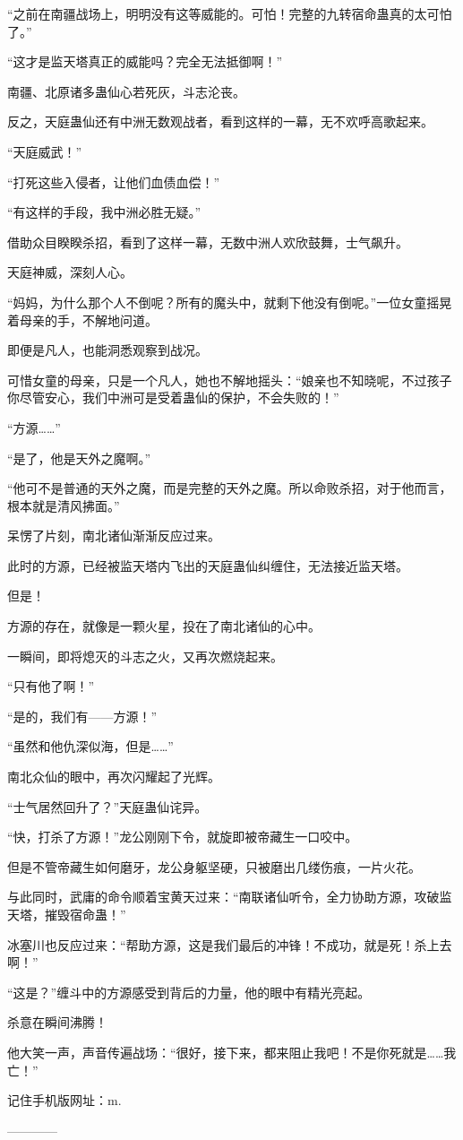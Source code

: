 \begin{this_body}
“之前在南疆战场上，明明没有这等威能的。可怕！完整的九转宿命蛊真的太可怕了。”

“这才是监天塔真正的威能吗？完全无法抵御啊！”

南疆、北原诸多蛊仙心若死灰，斗志沦丧。

反之，天庭蛊仙还有中洲无数观战者，看到这样的一幕，无不欢呼高歌起来。

“天庭威武！”

“打死这些入侵者，让他们血债血偿！”

“有这样的手段，我中洲必胜无疑。”

借助众目睽睽杀招，看到了这样一幕，无数中洲人欢欣鼓舞，士气飙升。

天庭神威，深刻人心。

“妈妈，为什么那个人不倒呢？所有的魔头中，就剩下他没有倒呢。”一位女童摇晃着母亲的手，不解地问道。

即便是凡人，也能洞悉观察到战况。

可惜女童的母亲，只是一个凡人，她也不解地摇头：“娘亲也不知晓呢，不过孩子你尽管安心，我们中洲可是受着蛊仙的保护，不会失败的！”

“方源……”

“是了，他是天外之魔啊。”

“他可不是普通的天外之魔，而是完整的天外之魔。所以命败杀招，对于他而言，根本就是清风拂面。”

呆愣了片刻，南北诸仙渐渐反应过来。

此时的方源，已经被监天塔内飞出的天庭蛊仙纠缠住，无法接近监天塔。

但是！

方源的存在，就像是一颗火星，投在了南北诸仙的心中。

一瞬间，即将熄灭的斗志之火，又再次燃烧起来。

“只有他了啊！”

“是的，我们有——方源！”

“虽然和他仇深似海，但是……”

南北众仙的眼中，再次闪耀起了光辉。

“士气居然回升了？”天庭蛊仙诧异。

“快，打杀了方源！”龙公刚刚下令，就旋即被帝藏生一口咬中。

但是不管帝藏生如何磨牙，龙公身躯坚硬，只被磨出几缕伤痕，一片火花。

与此同时，武庸的命令顺着宝黄天过来：“南联诸仙听令，全力协助方源，攻破监天塔，摧毁宿命蛊！”

冰塞川也反应过来：“帮助方源，这是我们最后的冲锋！不成功，就是死！杀上去啊！”

“这是？”缠斗中的方源感受到背后的力量，他的眼中有精光亮起。

杀意在瞬间沸腾！

他大笑一声，声音传遍战场：“很好，接下来，都来阻止我吧！不是你死就是……我亡！”

记住手机版网址：m.

------------

\end{this_body}

